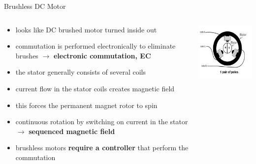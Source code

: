 \documentclass[compress]{beamer}
\begin{document}
\begin{frame}{Brushless DC Motor}

    \begin{columns}
        \begin{column}{0.7\linewidth}
\begin{itemize}
\small
\item looks like DC brushed motor turned inside out
\item commutation is performed electronically  to
  eliminate brushes $\rightarrow$ \textbf{electronic commutation, EC}
\item the stator generally consists of several coils
\item current flow in the stator coils creates magnetic field
\item this forces the permanent magnet rotor to spin
\item continuous rotation by switching on current
    in the stator $\rightarrow$ \textbf{sequenced magnetic field}
\item brushless motors \textbf{require a controller} that perform the commutation
\end{itemize}
            
        \end{column}
        \begin{column}{0.3\linewidth}
            \begin{center}
                \includegraphics[width=\linewidth]{brushless-schematic}
            \end{center}
        \end{column}
    \end{columns}

\end{frame}
\end{document}
